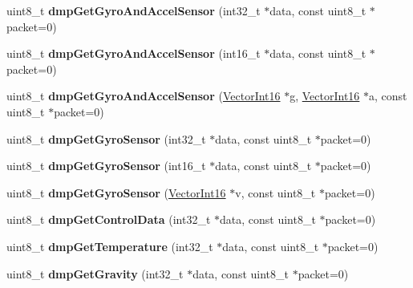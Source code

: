\begin{DoxyCompactItemize}
uint8\+\_\+t {\bfseries dmp\+Get\+Gyro\+And\+Accel\+Sensor} (int32\+\_\+t $\ast$data, const uint8\+\_\+t $\ast$packet=0)
\item 
\mbox{\label{classMPU6050_ad8caffca939574f73c7c300baee339b7}} 
uint8\+\_\+t {\bfseries dmp\+Get\+Gyro\+And\+Accel\+Sensor} (int16\+\_\+t $\ast$data, const uint8\+\_\+t $\ast$packet=0)
\item 
\mbox{\label{classMPU6050_a13b5eff727ce232fef884ee67df4487f}} 
uint8\+\_\+t {\bfseries dmp\+Get\+Gyro\+And\+Accel\+Sensor} (\mbox{\hyperlink{classVectorInt16}{Vector\+Int16}} $\ast$g, \mbox{\hyperlink{classVectorInt16}{Vector\+Int16}} $\ast$a, const uint8\+\_\+t $\ast$packet=0)
\item 
\mbox{\label{classMPU6050_adfe0bc92f57cf489583d5c3b07d7aefb}} 
uint8\+\_\+t {\bfseries dmp\+Get\+Gyro\+Sensor} (int32\+\_\+t $\ast$data, const uint8\+\_\+t $\ast$packet=0)
\item 
\mbox{\label{classMPU6050_a1c79849a8c39eb918945e98aea1dd878}} 
uint8\+\_\+t {\bfseries dmp\+Get\+Gyro\+Sensor} (int16\+\_\+t $\ast$data, const uint8\+\_\+t $\ast$packet=0)
\item 
\mbox{\label{classMPU6050_ad77de2fac9ea2b9c5e94aa245670fe48}} 
uint8\+\_\+t {\bfseries dmp\+Get\+Gyro\+Sensor} (\mbox{\hyperlink{classVectorInt16}{Vector\+Int16}} $\ast$v, const uint8\+\_\+t $\ast$packet=0)
\item 
\mbox{\label{classMPU6050_a7c11e874e2f0009503e0014dd2b1bf85}} 
uint8\+\_\+t {\bfseries dmp\+Get\+Control\+Data} (int32\+\_\+t $\ast$data, const uint8\+\_\+t $\ast$packet=0)
\item 
\mbox{\label{classMPU6050_a799f73f0eb419057b5fe2a02d7f1905d}} 
uint8\+\_\+t {\bfseries dmp\+Get\+Temperature} (int32\+\_\+t $\ast$data, const uint8\+\_\+t $\ast$packet=0)
\item 
\mbox{\label{classMPU6050_a4411714ec5a1bb90e4c224d5e9d98b56}} 
uint8\+\_\+t {\bfseries dmp\+Get\+Gravity} (int32\+\_\+t $\ast$data, const uint8\+\_\+t $\ast$packet=0)
\item 
\mbox{\label{classMPU6050_a557400f9ca5f07ff7d0d71f27f7a5169}} 

\end{DoxyCompactItemize}
